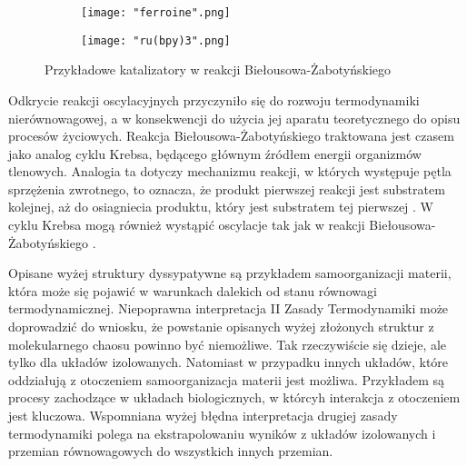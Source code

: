 \documentclass[10pt, a4paper, twoside, onecolumn]{article}
\numberwithin{equation}{section}
\begin{document}
	\begin{figure}[H]
		\centering
		\begin{subfigure}{0.45\textwidth}
			\centering
			\texttt{[image: "ferroine".png]}
			\caption{\cite{sigmaaldrich}}
			\label{fig:ferroine}
		\end{subfigure}
		\begin{subfigure}{0.45\textwidth}
			\centering
			\texttt{[image: "ru(bpy)3".png]}
			\caption{\cite{sigmaaldrich}}
			\label{fig:rubpy}
		\end{subfigure}
		\caption{Przykładowe katalizatory w reakcji Biełousowa-Żabotyńskiego}
	\end{figure}
	Odkrycie reakcji oscylacyjnych przyczyniło się do rozwoju termodynamiki nierównowagowej, a w konsekwencji do użycia jej aparatu teoretycznego do opisu procesów życiowych. 
	Reakcja Biełousowa-Żabotyńskiego traktowana jest czasem jako analog cyklu Krebsa, będącego głównym źródłem energii organizmów tlenowych. Analogia ta dotyczy mechanizmu reakcji, w których występuje pętla sprzężenia zwrotnego, to oznacza, że produkt pierwszej reakcji jest substratem kolejnej, aż do osiagniecia produktu, który jest substratem tej pierwszej \cite{belousov_hist, stryer}. W cyklu Krebsa mogą również wystąpić oscylacje tak jak w reakcji Biełousowa-Żabotyńskiego \cite{krebs_oscillations}. \par
	Opisane wyżej struktury dyssypatywne są przykładem samoorganizacji materii, która może się pojawić w warunkach dalekich od stanu równowagi termodynamicznej. Niepoprawna interpretacja II Zasady Termodynamiki może doprowadzić do wniosku, że powstanie opisanych wyżej złożonych struktur z molekularnego chaosu powinno być niemożliwe. Tak rzeczywiście się dzieje, ale tylko dla układów izolowanych. Natomiast w przypadku innych układów, które oddziałują z otoczeniem samoorganizacja materii jest możliwa. Przykładem są procesy zachodzące w układach biologicznych, w którcyh interakcja z otoczeniem jest kluczowa. %
	Wspomniana wyżej błędna interpretacja drugiej zasady termodynamiki polega na ekstrapolowaniu wyników z układów izolowanych i przemian równowagowych do wszystkich innych przemian.
	
	
\end{document}
